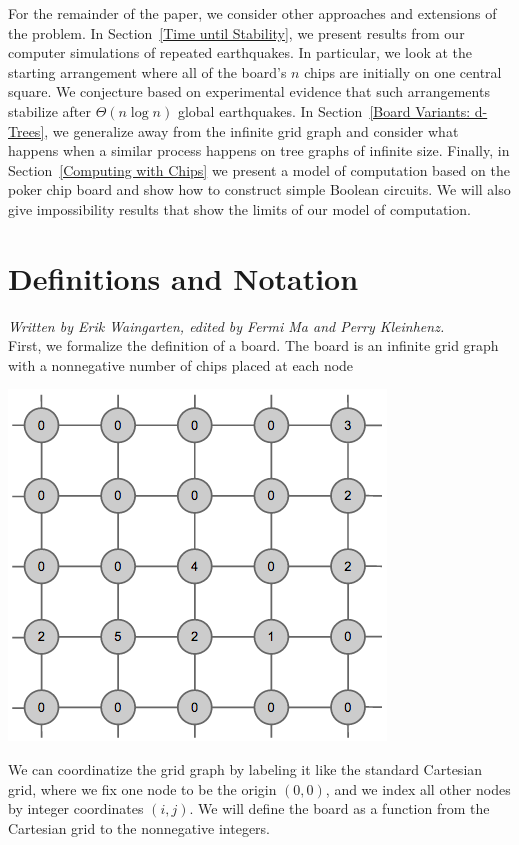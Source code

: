 \documentclass[runningheads,a4paper]{llncs}
\begin{document}
For the remainder of the paper, we consider other approaches and extensions of the problem. 
In  Section~\ref{Time until Stability}, we present results from our computer simulations of repeated earthquakes. In particular, we look at the starting arrangement where all of the board's $n$ chips are initially on one central square.
We conjecture based on experimental evidence that such arrangements stabilize after $\Theta(n \log n)$ global earthquakes. 
In Section~\ref{Board Variants: d-Trees}, we generalize away from the infinite grid graph and consider what happens when a similar process happens on tree graphs of infinite size. 
Finally, in Section~\ref{Computing with Chips} we present a model of computation based on the poker chip board and show how to construct simple Boolean circuits. We will also give impossibility results that show the limits of our model of computation.
\section{Definitions and Notation}
\label{Definitions and Notation}

\emph{Written by Erik Waingarten, edited by Fermi Ma and Perry Kleinhenz.}\\

First, we formalize the definition of a board. The board is an infinite grid graph with a nonnegative number of chips placed at each node
\begin{center}
\includegraphics[scale=0.5]{grid1.png}
\end{center}

We can coordinatize the grid graph by labeling it like the standard Cartesian grid, where we fix one node to be the origin $(0,0)$, and we index all other nodes by integer coordinates $(i,j)$. We will define the board as a function from the Cartesian grid to the nonnegative integers.
\end{document}

